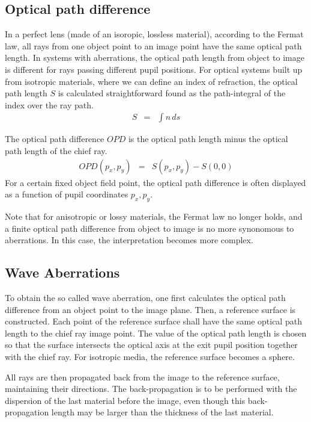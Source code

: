 \documentclass[12pt,a4paper,twoside,openright,BCOR10mm,headsepline,titlepage,abstracton,chapterprefix,final]{scrreprt}
\begin{document}
\subsection{Optical path difference}
In a perfect lens (made of an isoropic, lossless material), according to the Fermat law, all rays from one object point to an image point have the same optical path length. 
In systems with aberrations, the optical path length from object to image is different for rays passing different pupil positions.
For optical systems built up from isotropic materials, where we can define an index of refraction, the optical path length $S$ is calculated straightforward found as the path-integral of the index over the ray path.
\begin{eqnarray}
 S &=& \int n\, ds
\end{eqnarray}

The optical path difference $OPD$ is the optical path length minus the optical path length of the chief ray.
\begin{eqnarray}
 OPD(p_x,p_y) &=& S(p_x,p_y) - S(0,0)
\end{eqnarray}
For a certain fixed object field point, the optical path difference is often displayed as a function of pupil coordinates $p_x,p_y$.

Note that for anisotropic or lossy materials, the Fermat law no longer holds, and a finite optical path difference from object to image is no more synonomous to aberrations.
In this case, the interpretation becomes more complex.

\subsection{Wave Aberrations}
To obtain the so called wave aberration, one first calculates the optical path difference from an object point to the image plane.
Then, a reference surface is constructed. 
Each point of the reference surface shall have the same optical path length to the chief ray image point.
The value of the optical path length is chosen so that the surface intersects the optical axis at the exit pupil position together with the chief ray.
For isotropic media, the reference surface becomes a sphere.

All rays are then propagated back from the image to the reference surface, maintaining their directions.
The back-propagation is to be performed with the dispersion of the last material before the image, even though this back-propagation length may be larger than the thickness of the last material.
\end{document}
